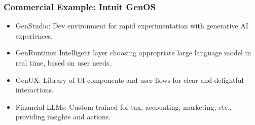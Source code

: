 \begin{frame}[fragile]\frametitle{Commercial Example: Intuit GenOS}

\begin{itemize}
    \item GenStudio: Dev environment for rapid experimentation with generative AI experiences.
    \item GenRuntime: Intelligent layer choosing appropriate large language model in real time, based on user needs.
    \item GenUX: Library of UI components and user flows for clear and delightful interactions.
    \item Financial LLMs: Custom trained for tax, accounting, marketing, etc., providing insights and actions.
\end{itemize}

\end{frame}

